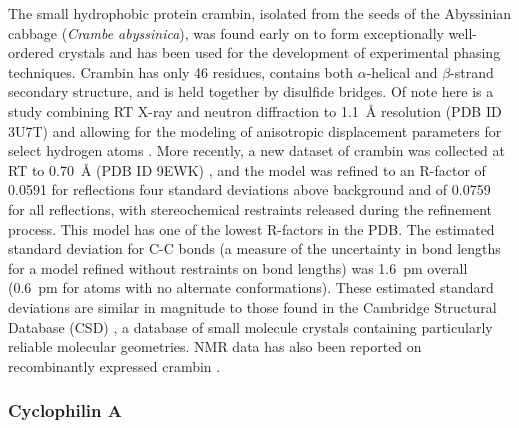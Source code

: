 \documentclass[9pt,review,pubversion]{livecoms}
\begin{document}
The small hydrophobic protein crambin, isolated from the seeds of the Abyssinian cabbage (\textit{Crambe abyssinica}), was found early on to form exceptionally well-ordered crystals \cite{teeter_water_1984} and has been used for the development of experimental phasing techniques.
Crambin has only 46 residues, contains both $\alpha$-helical and $\beta$-strand secondary structure, and is held together by disulfide bridges.
Of note here is a study combining RT X-ray and neutron diffraction to \qty{1.1}{\angstrom} resolution (PDB ID 3U7T) and allowing for the modeling of anisotropic displacement parameters for select hydrogen atoms \cite{chen_room-temperature_2012}.
More recently, a new dataset of crambin was collected at RT to \qty{0.70}{\angstrom} (PDB ID 9EWK) \cite{chen_solvent_2024}, and the model was refined to an R-factor of 0.0591 for reflections four standard deviations above background and of 0.0759 for all reflections, with stereochemical restraints released during the refinement process.
This model has one of the lowest R-factors in the PDB.
The estimated standard deviation for C-C bonds (a measure of the uncertainty in bond lengths for a model refined without restraints on bond lengths) was \qty{1.6}{\pico\meter} overall (\qty{0.6}{\pico\meter} for atoms with no alternate conformations).
These estimated standard deviations are similar in magnitude to those found in the Cambridge Structural Database (CSD) \cite{groom_cambridge_2016}, a database of small molecule crystals containing particularly reliable molecular geometries. 
NMR data has also been reported on recombinantly expressed crambin \cite{ahn_three-dimensional_2006}.

\subsubsection{Cyclophilin A}
\label{sub2:cypa}
\end{document}
